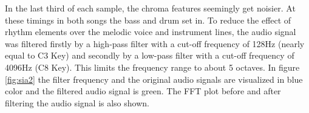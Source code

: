 In the last third of each sample, the chroma features seemingly get noisier. At these timings in both songs the bass and drum set in. To reduce the effect of rhythm elements over the melodic voice and instrument lines, the audio signal was filtered firstly by a high-pass filter with a cut-off frequency of 128Hz (nearly equal to C3 Key) and secondly by a low-pass filter with a cut-off frequency of 4096Hz (C8 Key). This limits the frequency range to about 5 octaves. 
In figure \ref{fig:sia2} the filter frequency and the original audio signals are visualized in blue color and the filtered audio signal is green. The FFT plot before and after filtering the audio signal is also shown. 
\begin{figure}[htbp]
	\centering
\end{figure}

